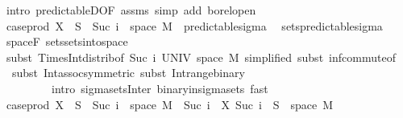 \begin{isabellebody}
\ {\isacharparenleft}{\kern0pt}intro\ predictableD{\isacharbrackleft}{\kern0pt}OF\ assms{\isacharbrackright}{\kern0pt}{\isacharcomma}{\kern0pt}\ simp\ add{\isacharcolon}{\kern0pt}\ borel{\isacharunderscore}{\kern0pt}open{\isacharparenright}{\kern0pt}\isanewline
\ \ \ \ \isamarkupfalse%
\ \isamarkupfalse%
\ {\isachardoublequoteopen}case{\isacharunderscore}{\kern0pt}prod\ X\ {\isacharminus}{\kern0pt}{\isacharbackquote}{\kern0pt}\ S\ {\isasyminter}\ {\isacharparenleft}{\kern0pt}{\isacharbraceleft}{\kern0pt}Suc\ i{\isacharbraceright}{\kern0pt}\ {\isasymtimes}\ space\ M{\isacharparenright}{\kern0pt}\ {\isasymin}\ predictable{\isacharunderscore}{\kern0pt}sigma{\isachardoublequoteclose}\ \isamarkupfalse%
\ sets{\isacharunderscore}{\kern0pt}predictable{\isacharunderscore}{\kern0pt}sigma\ \isamarkupfalse%
\ space{\isacharunderscore}{\kern0pt}F\ sets{\isachardot}{\kern0pt}sets{\isacharunderscore}{\kern0pt}into{\isacharunderscore}{\kern0pt}space\isanewline
\ \ \ \ \ \ \isamarkupfalse%
\ {\isacharparenleft}{\kern0pt}subst\ Times{\isacharunderscore}{\kern0pt}Int{\isacharunderscore}{\kern0pt}distrib{}{\isacharbrackleft}{\kern0pt}of\ {\isachardoublequoteopen}{\isacharbraceleft}{\kern0pt}Suc\ i{\isacharbraceright}{\kern0pt}{\isachardoublequoteclose}\ UNIV\ {\isachardoublequoteopen}space\ M{\isachardoublequoteclose}{\isacharcomma}{\kern0pt}\ simplified{\isacharbrackright}{\kern0pt}{\isacharcomma}{\kern0pt}\ subst\ inf{\isachardot}{\kern0pt}commute{\isacharbrackleft}{\kern0pt}of\ {\isachardoublequoteopen}{\isacharunderscore}{\kern0pt}\ {\isasymtimes}\ {\isacharunderscore}{\kern0pt}{\isachardoublequoteclose}{\isacharbrackright}{\kern0pt}{\isacharcomma}{\kern0pt}\ subst\ Int{\isacharunderscore}{\kern0pt}assoc{\isacharbrackleft}{\kern0pt}symmetric{\isacharbrackright}{\kern0pt}{\isacharcomma}{\kern0pt}\ subst\ Int{\isacharunderscore}{\kern0pt}range{\isacharunderscore}{\kern0pt}binary{\isacharparenright}{\kern0pt}\ \isanewline
\ \ \ \ \ \ \ \ \ {\isacharparenleft}{\kern0pt}intro\ sigma{\isacharunderscore}{\kern0pt}sets{\isacharunderscore}{\kern0pt}Inter\ binary{\isacharunderscore}{\kern0pt}in{\isacharunderscore}{\kern0pt}sigma{\isacharunderscore}{\kern0pt}sets{\isacharcomma}{\kern0pt}\ fast{\isacharparenright}{\kern0pt}{\isacharplus}{\kern0pt}\isanewline
\ \ \ \ \isamarkupfalse%
\ \isamarkupfalse%
\ {\isachardoublequoteopen}case{\isacharunderscore}{\kern0pt}prod\ X\ {\isacharminus}{\kern0pt}{\isacharbackquote}{\kern0pt}\ S\ {\isasyminter}\ {\isacharparenleft}{\kern0pt}{\isacharbraceleft}{\kern0pt}Suc\ i{\isacharbraceright}{\kern0pt}\ {\isasymtimes}\ space\ M{\isacharparenright}{\kern0pt}\ {\isacharequal}{\kern0pt}\ {\isacharbraceleft}{\kern0pt}Suc\ i{\isacharbraceright}{\kern0pt}\ {\isasymtimes}\ {\isacharparenleft}{\kern0pt}X\ {\isacharparenleft}{\kern0pt}Suc\ i{\isacharparenright}{\kern0pt}\ {\isacharminus}{\kern0pt}{\isacharbackquote}{\kern0pt}\ S\ {\isasyminter}\ space\ M{\isacharparenright}{\kern0pt}{\isachardoublequoteclose}\ \isamarkupfalse%

\end{isabellebody}
